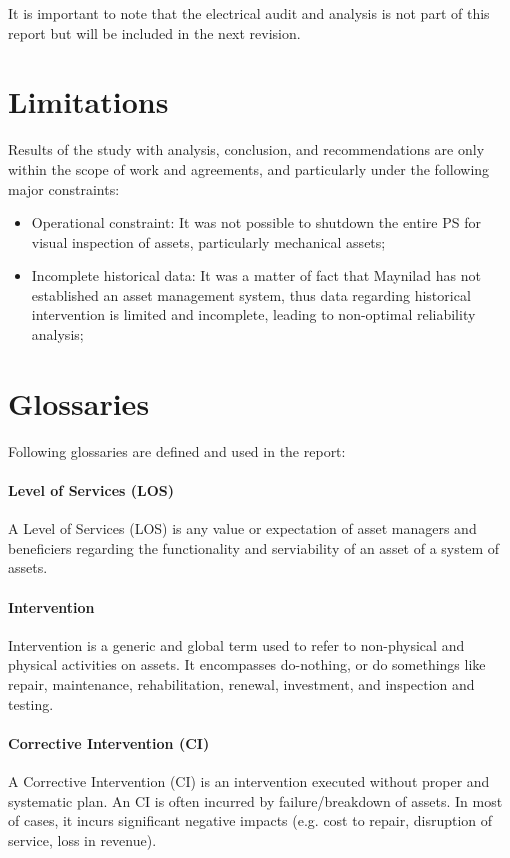 {\color{red}
It is important to note that the electrical audit and analysis is not part of this report but will be included in the next revision.
}


\section{Limitations}
Results of the study with analysis, conclusion, and recommendations are only within the scope of work and agreements, and particularly under the following major constraints:
\begin{itemize}
\item Operational constraint: It was not possible to shutdown the entire PS for visual inspection of assets, particularly mechanical assets;
\item Incomplete historical data: It was a matter of fact that Maynilad has not established an asset management system, thus data regarding historical intervention is limited and incomplete, leading to non-optimal reliability analysis; 
\end{itemize}



\section{Glossaries}
Following glossaries are defined and used in the report:

\paragraph{\textbf{Level of Services (LOS)}}
A Level of Services (LOS) is any value or expectation of asset managers and beneficiers regarding the functionality and serviability of an asset of a system of assets.

\paragraph{\textbf{Intervention}}
Intervention is a generic and global term used to refer to non-physical and physical activities on assets. It encompasses do-nothing, or do somethings like repair, maintenance, rehabilitation, renewal, investment, and inspection and testing.

\paragraph{\textbf{Corrective Intervention (CI)}}
A Corrective Intervention (CI) is an intervention executed without proper and systematic plan. An CI is often incurred by failure/breakdown of assets. In most of cases, it incurs significant negative impacts (e.g. cost to repair, disruption of service, loss in revenue).

